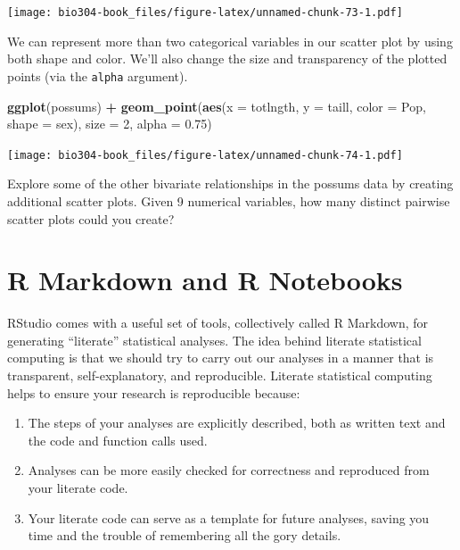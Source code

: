 \documentclass[]{book}
\newenvironment{Shaded}{\begin{snugshade}}{\end{snugshade}}
\newcommand{\DataTypeTok}[1]{\textcolor[rgb]{0.13,0.29,0.53}{#1}}
\newcommand{\DecValTok}[1]{\textcolor[rgb]{0.00,0.00,0.81}{#1}}
\newcommand{\FloatTok}[1]{\textcolor[rgb]{0.00,0.00,0.81}{#1}}
\newcommand{\KeywordTok}[1]{\textcolor[rgb]{0.13,0.29,0.53}{\textbf{#1}}}
\newcommand{\NormalTok}[1]{#1}
\newcommand{\OperatorTok}[1]{\textcolor[rgb]{0.81,0.36,0.00}{\textbf{#1}}}
\newcommand{\StringTok}[1]{\textcolor[rgb]{0.31,0.60,0.02}{#1}}
\providecommand{\tightlist}{%
  \setlength{\itemsep}{0pt}\setlength{\parskip}{0pt}}
\theoremstyle{definition}
\theoremstyle{definition}
\theoremstyle{definition}
\theoremstyle{remark}
\begin{document}
\texttt{[image: bio304-book\_files/figure-latex/unnamed-chunk-73-1.pdf]}

We can represent more than two categorical variables in our scatter plot
by using both shape and color. We'll also change the size and
transparency of the plotted points (via the \texttt{alpha} argument).

\begin{Shaded}
\begin{Highlighting}[]
\KeywordTok{ggplot}\NormalTok{(possums) }\OperatorTok{+}\StringTok{ }
\StringTok{  }\KeywordTok{geom_point}\NormalTok{(}\KeywordTok{aes}\NormalTok{(}\DataTypeTok{x =}\NormalTok{ totlngth, }\DataTypeTok{y =}\NormalTok{ taill, }\DataTypeTok{color =}\NormalTok{ Pop, }\DataTypeTok{shape =}\NormalTok{ sex),}
             \DataTypeTok{size =} \DecValTok{2}\NormalTok{, }\DataTypeTok{alpha =} \FloatTok{0.75}\NormalTok{)}
\end{Highlighting}
\end{Shaded}

\texttt{[image: bio304-book\_files/figure-latex/unnamed-chunk-74-1.pdf]}

Explore some of the other bivariate relationships in the possums data by
creating additional scatter plots. Given 9 numerical variables, how many
distinct pairwise scatter plots could you create?

\hypertarget{r-markdown-and-r-notebooks}{%
\chapter{R Markdown and R Notebooks}\label{r-markdown-and-r-notebooks}}

RStudio comes with a useful set of tools, collectively called R
Markdown, for generating ``literate'' statistical analyses. The idea
behind literate statistical computing is that we should try to carry out
our analyses in a manner that is transparent, self-explanatory, and
reproducible. Literate statistical computing helps to ensure your
research is reproducible because:

\begin{enumerate}
\def\labelenumi{\arabic{enumi}.}
\tightlist
\item
  The steps of your analyses are explicitly described, both as written
  text and the code and function calls used.
\item
  Analyses can be more easily checked for correctness and reproduced
  from your literate code.
\item
  Your literate code can serve as a template for future analyses, saving
  you time and the trouble of remembering all the gory details.
\end{enumerate}
\end{document}
